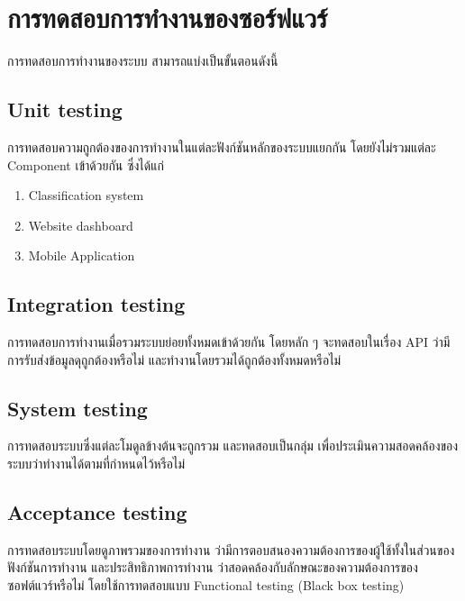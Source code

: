 \section{การทดสอบการทำงานของซอร์ฟแวร์}
การทดสอบการทำงานของระบบ สามารถแบ่งเป็นขั้นตอนดังนี้
\subsection{Unit testing}
การทดสอบความถูกต้องของการทำงานในแต่ละฟังก์ชันหลักของระบบแยกกัน โดยยังไม่รวมแต่ละ Component เข้าด้วยกัน ซึ่งได้แก่
\begin{enumerate}
  \item Classification system
  \item Website dashboard
  \item Mobile Application
\end{enumerate}

\subsection{Integration testing}
การทดสอบการทำงานเมื่อรวมระบบย่อยทั้งหมดเข้าด้วยกัน โดยหลัก ๆ
จะทดสอบในเรื่อง API ว่ามีการรับส่งข้อมูลดุถูกต้องหรือไม่ และทำงานโดยรวมได้ถูกต้องทั้งหมดหรือไม่
\subsection{System testing}
การทดสอบระบบซึ่งแต่ละโมดูลข้างต้นจะถูกรวม และทดสอบเป็นกลุ่ม
เพื่อประเมินความสอดคล้องของระบบว่าทำงานได้ตามที่กำหนดไว้หรือไม่
\subsection{Acceptance testing}
การทดสอบระบบโดยดูภาพรวมของการทำงาน ว่ามีการตอบสนองความต้องการของผู้ใช้ทั้งในส่วนของฟังก์ชันการทำงาน
และประสิทธิภาพการทำงาน ว่าสอดคล้องกับลักษณะของความต้องการของซอฟต์แวร์หรือไม่
โดยใช้การทดสอบแบบ Functional testing (Black box testing)











